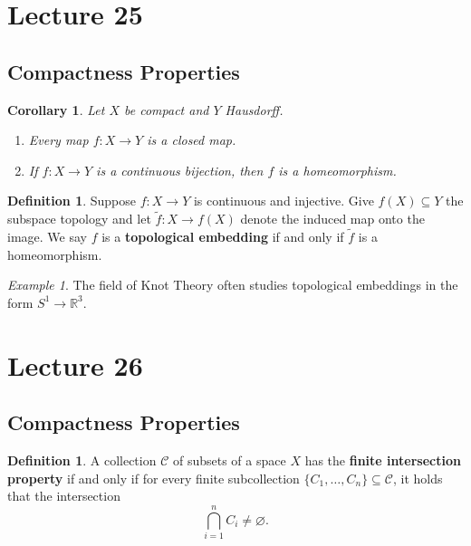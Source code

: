 \documentclass[ 12pt ]{article}
\newcounter{lecture_num}
\theoremstyle{plain}
\theoremstyle{plain}
\newtheorem{corollary}[theorem]{Corollary}
\theoremstyle{definition}
\newtheorem{definition}[theorem]{Definition}
\theoremstyle{remark}
\newtheorem{example}[theorem]{Example}
\begin{document}
\setcounter{lecture_num}{25}
\setcounter{theorem}{0}
\section*{Lecture 25}

\subsection*{Compactness Properties}

\begin{corollary}
	Let $X$ be compact and $Y$ Hausdorff.
	\begin{enumerate}
		\item Every map $f : X \to Y$ is a closed map.
		\item If $f : X \to Y$ is a continuous bijection, then $f$ is a homeomorphism.
	\end{enumerate}
\end{corollary}

\begin{definition}
	Suppose $f : X \to Y$ is continuous and injective. Give $f(X) \subseteq Y$ the subspace topology and let $\widetilde{f} : X \to f(X)$ denote the induced map onto the image. We say
	$f$ is a \textbf{topological embedding} if and only if $\widetilde{f}$ is a homeomorphism.
\end{definition}

\begin{example}
	The field of Knot Theory often studies topological embeddings in the form $S^1 \to \mathbb{R}^3$.
\end{example}

\setcounter{lecture_num}{26}
\setcounter{theorem}{0}
\section*{Lecture 26}

\subsection*{Compactness Properties}

\begin{definition}
	A collection $\mathcal{C}$ of subsets of a space $X$ has the \textbf{finite intersection property} if and only if for every finite subcollection $\{ C_1, \hdots, C_n \} \subseteq
	\mathcal{C}$, it holds that the intersection $$\bigcap_{i = 1}^n C_i \neq \varnothing.$$
\end{definition}
\end{document}
